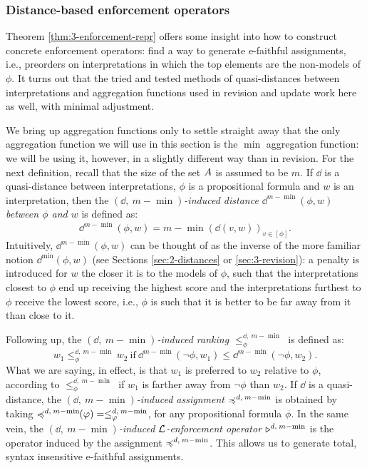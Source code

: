 \subsubsection{Distance-based enforcement operators}
Theorem \ref{thm:3-enforcement-repr} offers some insight 
into how to construct concrete enforcement operators:
find a way to generate e-faithful assignments, 
i.e., preorders on interpretations in which the top elements 
are the non-models of $\phi$.
It turns out that the tried and tested methods of 
quasi-distances between interpretations
and aggregation functions 
used in revision and update work here as well, with minimal adjustment.

We bring up aggregation functions only to settle straight away 
that the only aggregation function we will use in this section 
is the $\min$ aggregation function: we will be using it, however,
in a slightly different way than in revision.
For the next definition, recall that the size of the set $A$
is assumed to be $m$.
If $\dd$ is a quasi-distance between interpretations,
$\phi$ is a propositional formula and $w$ is an interpretation,
then the 
\emph{$(\dd,\:m-\min)$-induced distance $\dd^{m-\min}(\phi,w)$ between $\phi$ and $w$} 
is defined as:
$$
	\dd^{m-\min}(\phi,w) = m-\min(\dd(v,w))_{v\in[\phi]}.
$$
Intuitively, $\dd^{m-\min}(\phi,w)$ can be thought of as the inverse
of the more familiar notion $\dd^{\min}(\phi,w)$ 
(see Sections \ref{sec:2-distances} or \ref{sec:3-revision}):
a penalty is introduced for $w$ the closer it is to the models of $\phi$,
such that the interpretations closest to $\phi$ end up receiving the 
highest score
and the interpretations furthest to $\phi$ receive the lowest score,
i.e., $\phi$ is such that it is better to be far away from it than close to it.

Following up, the \emph{$(\dd,\:m-\min)$-induced ranking $\le^{\dd,\:m-\min}_{\phi}$}
is defined as:
$$
	w_1\le^{\dd,\:m-\min}_\phi w_2~\text{if}~\dd^{m-\min}(\lnot\phi,w_1)\le\dd^{m-\min}(\lnot\phi,w_2).
$$
What we are saying, in effect, is that $w_1$ is preferred to $w_2$ relative to $\phi$,
according to $\le^{\dd,\:m-\min}_{\phi}$ if $w_1$ is farther away from $\lnot\phi$ than $w_2$.
If $\dd$ is a quasi-distance,
the \emph{${(\dd,\:m-\min)}$-induced assignment $\preccurlyeq^{d,\:m-{\operatorname{min}}}$} is obtained by taking 
$\preccurlyeq^{d,\:m-{\operatorname{min}}}\!\!(\varphi)=\le_\varphi^{d,\:m-{\operatorname{min}}}$,
for any propositional formula $\phi$.
In the same vein, the \emph{${(\dd,\:m-\min)}$-induced $\mathcal{L}$-enforcement operator $\triangleright^{d,\:m-{\operatorname{min}}}$} 
is the operator induced by the assignment $\preccurlyeq^{d,\:m-{\operatorname{min}}}$.
This allows us to generate total, syntax insensitive e-faithful assignments.

